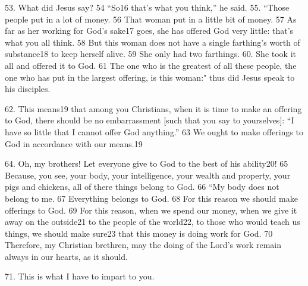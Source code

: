 53. What did Jesus say? 54 ``So16 that's what you think,'' he said.
55. ``Those people put in a lot of money. 56 That woman put in a little
bit of money. 57 As far as her working for God's sake17 goes, she has offered God
very little: that's what you all think. 58 But this woman does not have a single
farthing's worth of substance18 to keep herself alive. 59 She only had two farthings.
60. She took it all and offered it to God. 61 The one who is the greatest of all
these people, the one who has put in the largest offering, is this woman:"
thus did Jesus speak to his disciples.

62. This means19 that among you Christians, when it is time to make an offering
to God, there should be no embarrassment [such that you say to yourselves]: ``I
have so little that I cannot offer God anything.'' 63 We ought to make
offerings to God in accordance with our means.19

64. Oh, my brothers! Let everyone give to God to the best of his ability20! 65 Because,
you see, your body, your intelligence, your wealth and property, your pigs and
chickens, all of there things belong to God. 66 ``My body does not belong
to me. 67 Everything belongs to God. 68 For this reason we should make offerings
to God. 69 For this reason, when we spend our money, when we give it away on the
outside21 to the people of the world22, to those who would teach us things, we
should make sure23 that this money is doing work for God. 70 Therefore, my Christian
brethren, may the doing of the Lord's work remain always in our hearts, as it should.

71. This is what I have to impart to you.

